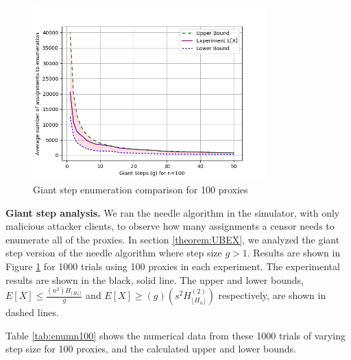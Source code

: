 \begin{figure}[h!]
\centering
     \includegraphics[width=0.8\textwidth]{fig/needle_expected_value_n_100.png}
    \caption{Giant step enumeration comparison for 100 proxies}

    \label{fig:gsn100}
\end{figure}

\textbf{Giant step analysis.} We ran the needle algorithm in the simulator, with only malicious attacker clients, to observe how many assignments a censor needs to enumerate all of the proxies. In section \ref{theorem:UBEX}, we analyzed the giant step version of the needle algorithm where step size $g > 1$. Results are shown in Figure \ref{fig:gsn100} for 1000 trials using 100 proxies in each experiment. The experimental results are shown in the black, solid line. The upper and lower bounds, $E[X] \leq \frac{(n^2)H_{\lceil{H_n}\rceil}}{g}$ and $E[X] \geq (g)(s^2H^{(2)}_{\lfloor{H_n}\rfloor})$ respectively, are shown in dashed lines.

Table \ref{tab:enumn100} shows the numerical data from these 1000 trials of varying step size for 100 proxies, and the calculated upper and lower bounds.

